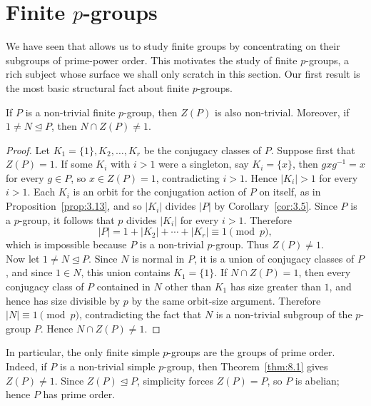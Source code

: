 \documentclass[../Odyssey_Project.tex]{subfiles}
\begin{document}
\setcounter{section}{7}
\section{Finite \texorpdfstring{$p$}{p}-groups}

We have seen that  allows us to study finite groups by concentrating on their subgroups of prime-power order. This motivates the study of finite $p$-groups, a rich subject whose surface we shall only scratch in this section. Our first result is the most basic structural fact about finite $p$-groups.

\begin{theorem}
\label{thm:8.1}
If $P$ is a non-trivial finite $p$-group, then $Z(P)$ is also non-trivial. Moreover, if $1 \neq N \trianglelefteq P$, then $N \cap Z(P) \neq 1$.
\end{theorem}
\begin{proof}
Let $K_1=\{1\},K_2,\ldots,K_r$ be the conjugacy classes of $P$. Suppose first that $Z(P)=1$. If some $K_i$ with $i>1$ were a singleton, say $K_i=\{x\}$, then $gxg^{-1}=x$ for every $g\in P$, so $x\in Z(P)=1$, contradicting $i>1$. Hence $\lvert K_i\rvert>1$ for every $i>1$. Each $K_i$ is an orbit for the conjugation action of $P$ on itself, as in Proposition~\ref{prop:3.13}, and so $\lvert K_i\rvert$ divides $\lvert P\rvert$ by Corollary~\ref{cor:3.5}. Since $P$ is a $p$-group, it follows that $p$ divides $\lvert K_i\rvert$ for every $i>1$. Therefore
\[
    \lvert P\rvert
    =1+\lvert K_2\rvert+\cdots+\lvert K_r\rvert
    \equiv 1 \pmod p,
\]
which is impossible because $P$ is a non-trivial $p$-group. Thus $Z(P)\neq 1$.\\
Now let $1\neq N\trianglelefteq P$. Since $N$ is normal in $P$, it is a union of conjugacy classes of $P$, and since $1\in N$, this union contains $K_1=\{1\}$. If $N\cap Z(P)=1$, then every conjugacy class of $P$ contained in $N$ other than $K_1$ has size greater than $1$, and hence has size divisible by $p$ by the same orbit-size argument. Therefore $\lvert N\rvert\equiv 1\pmod p$, contradicting the fact that $N$ is a non-trivial subgroup of the $p$-group $P$. Hence $N\cap Z(P)\neq 1$.
\end{proof}

In particular, the only finite simple $p$-groups are the groups of prime order. Indeed, if $P$ is a non-trivial simple $p$-group, then Theorem~\ref{thm:8.1} gives $Z(P) \neq 1$. Since $Z(P) \trianglelefteq P$, simplicity forces $Z(P)=P$, so $P$ is abelian; hence $P$ has prime order.
\end{document}
